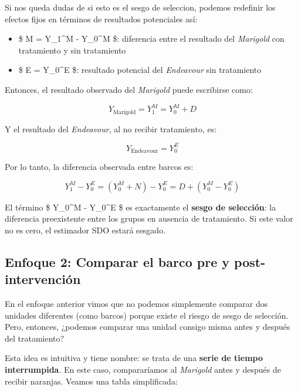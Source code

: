 \documentclass[
  letterpaper,
  DIV=11,
  numbers=noendperiod,
  oneside]{scrreprt}
\providecommand{\tightlist}{%
  \setlength{\itemsep}{0pt}\setlength{\parskip}{0pt}}\usepackage{longtable,booktabs,array}
\begin{document}
\begin{tcolorbox}[enhanced jigsaw, breakable, colback=white, rightrule=.15mm, opacityback=0, colframe=quarto-callout-color-frame, bottomrule=.15mm, left=2mm, toprule=.15mm, leftrule=.75mm, arc=.35mm]
Si nos queda dudas de si esto es el sesgo de seleccion, podemos
redefinir los efectos fijos en términos de resultados potenciales así:

\begin{itemize}
\tightlist
\item
  \$ M = Y\_1\^{}M - Y\_0\^{}M \$: diferencia entre el resultado del
  \emph{Marigold} con tratamiento y sin tratamiento\\
\item
  \$ E = Y\_0\^{}E \$: resultado potencial del \emph{Endeavour} sin
  tratamiento
\end{itemize}

Entonces, el resultado observado del \emph{Marigold} puede escribirse
como:

\[
Y_{\text{Marigold}} = Y_1^M = Y_0^M + D
\]

Y el resultado del \emph{Endeavour}, al no recibir tratamiento, es:

\[
Y_{\text{Endeavour}} = Y_0^E
\]

Por lo tanto, la diferencia observada entre barcos es:

\[
Y_1^M - Y_0^E = (Y_0^M + N) - Y_0^E = D + (Y_0^M - Y_0^E)
\]

El término \$ Y\_0\^{}M - Y\_0\^{}E \$ es exactamente el \textbf{sesgo
de selección}: la diferencia preexistente entre los grupos en ausencia
de tratamiento. Si este valor no es cero, el estimador SDO estará
sesgado.
\end{tcolorbox}

\hypertarget{enfoque-2-comparar-el-barco-pre-y-post-intervenciuxf3n}{%
\subsection{Enfoque 2: Comparar el barco pre y
post-intervención}\label{enfoque-2-comparar-el-barco-pre-y-post-intervenciuxf3n}}

En el enfoque anterior vimos que no podemos simplemente comparar dos
unidades diferentes (como barcos) porque existe el riesgo de sesgo de
selección. Pero, entonces, ¿podemos comparar una unidad consigo misma
antes y después del tratamiento?

Esta idea es intuitiva y tiene nombre: se trata de una \textbf{serie de
tiempo interrumpida}. En este caso, compararíamos al \emph{Marigold}
antes y después de recibir naranjas. Veamos una tabla simplificada:
\end{document}
